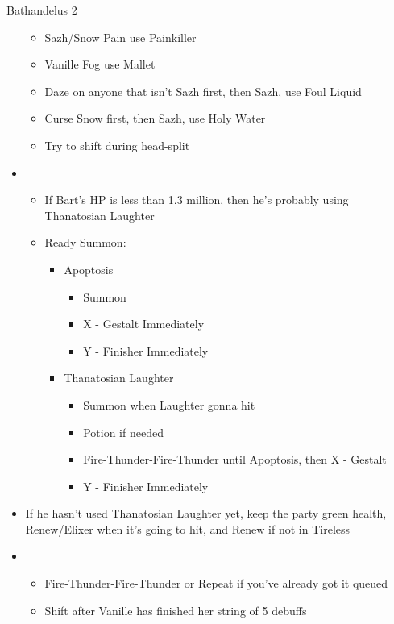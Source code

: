\documentclass{report}
\begin{document}
\begin{battle}{Bathandelus 2}
\begin{multicols}{2}
\begin{itemize}
\begin{itemize}
        \item Sazh/Snow Pain use Painkiller
        \item Vanille Fog use Mallet
        \item Daze on anyone that isn't Sazh first, then Sazh, use Foul Liquid
        \item Curse Snow first, then Sazh, use Holy Water
        \item Try to shift during head-split
    \end{itemize}
    \item \third
    \begin{itemize}
        \item If Bart's HP is less than 1.3 million, then he's probably using Thanatosian Laughter
        \item Ready Summon:
        \begin{itemize}
            \item Apoptosis
            \begin{itemize}
                \item Summon
                \item X - Gestalt Immediately
                \item Y - Finisher Immediately
            \end{itemize}
            \item Thanatosian Laughter
            \begin{itemize}
                \item Summon when Laughter gonna hit
                \item Potion if needed
                \item Fire-Thunder-Fire-Thunder until Apoptosis, then X - Gestalt
                \item Y - Finisher Immediately
            \end{itemize}
        \end{itemize}
    \end{itemize}
    \columnbreak
    \item If he hasn't used Thanatosian Laughter yet, keep the party green health, Renew/Elixer when it's going to hit, and Renew if not in Tireless
    \item \third
    \begin{itemize}
        \item Fire-Thunder-Fire-Thunder or Repeat if you've already got it queued
        \item Shift after Vanille has finished her string of 5 debuffs

\end{itemize}
\end{itemize}
\end{multicols}
\end{battle}
\end{document}
